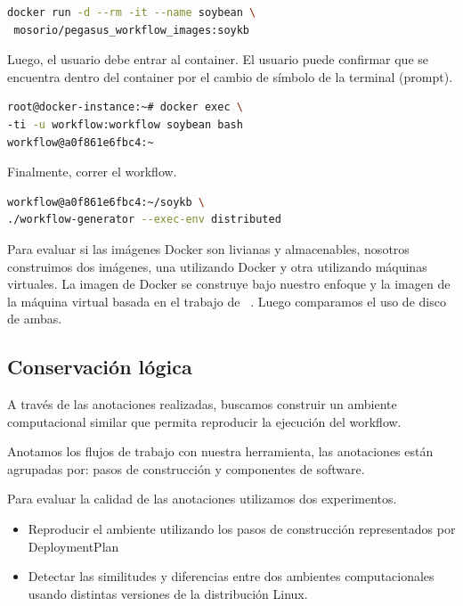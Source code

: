\begin{lstlisting}[caption={Descarga y correr la imagen disponible en DockerHub mosorio/pegasus\_workflow\_images:soykb},label={lst:1},language=bash]
docker run -d --rm -it --name soybean \
 mosorio/pegasus_workflow_images:soykb
\end{lstlisting}

Luego, el usuario debe entrar al container. El usuario puede confirmar que se encuentra dentro del container por el cambio de símbolo de la terminal  (prompt).

\begin{lstlisting}[caption={Entrar al ambiente computacional utilizando bash},label={lst:2},language=bash]
root@docker-instance:~# docker exec \
-ti -u workflow:workflow soybean bash
workflow@a0f861e6fbc4:~ 
\end{lstlisting}

Finalmente, correr el workflow. 

\begin{lstlisting}[caption={Run the workflow},label={lst:3},language=bash]
workflow@a0f861e6fbc4:~/soykb \
./workflow-generator --exec-env distributed	
\end{lstlisting}

Para evaluar si las imágenes Docker son livianas y almacenables, nosotros construimos dos imágenes, una utilizando Docker y otra utilizando máquinas virtuales. La imagen de Docker se construye bajo nuestro enfoque y la imagen de la máquina virtual basada en el trabajo de ~\cite{santana2017reproducibility}. Luego comparamos el uso de disco de ambas.



\subsection{Conservación lógica}\label{s5.3}

A través de las anotaciones realizadas, buscamos construir un ambiente computacional similar que permita reproducir la ejecución del workflow. 

Anotamos los flujos de trabajo con nuestra herramienta, las anotaciones están agrupadas por: pasos de construcción y componentes de software. 

Para evaluar la calidad de las anotaciones utilizamos dos experimentos.

\begin{itemize}
	\item Reproducir el ambiente utilizando los pasos de construcción representados por DeploymentPlan
	\item Detectar las similitudes y diferencias entre dos ambientes computacionales usando distintas versiones de la distribución Linux.
\end{itemize}







